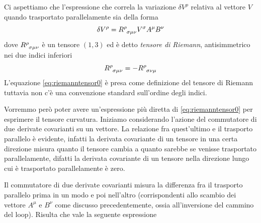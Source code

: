 \documentclass[twoside]{article}
\begin{document}
Ci aspettiamo che l'espressione che correla la variazione $\delta V^\rho$ relativa al vettore $V$ quando trasportato parallelamente sia della forma
\begin{equation}\label{eq:riemanntensor0}
	\delta V^\rho = R\indices{^\rho_\sigma_\mu_\nu}V^\sigma A^\mu B^\nu
\end{equation}
dove $R\indices{^\rho_\sigma_\mu_\nu}$ è un tensore $(1,3)$ ed è detto \emph{tensore di Riemann}, antisimmetrico nei due indici inferiori
\begin{equation}\label{eq:riemanntensor1}
		R\indices{^\rho_\sigma_\mu_\nu} = -R\indices{^\rho_\sigma_\nu_\mu}
\end{equation}
L'equazione \ref{eq:riemanntensor0} è presa come definizione del tensore di Riemann tuttavia non c'è una convenzione standard sull'ordine degli indici.

Vorremmo però poter avere un'espressione più diretta di \ref{eq:riemanntensor0} per esprimere il tensore curvatura. Iniziamo considerando l'azione del commutatore di due derivate covarianti su un vettore. La relazione fra quest'ultimo e il trasporto parallelo è evidente, infatti la derivata covariante di un tensore in una certa direzione misura quanto il tensore cambia a quanto sarebbe se venisse trasportato parallelamente, difatti la derivata covariante di un tensore nella direzione lungo cui è trasportato parallelamente è zero.

Il commutatore di due derivate covarianti misura la differenza fra il trasporto parallelo prima in un modo e poi nell'altro (corrispondenti allo scambio dei vettore $A^\mu$ e $B^\nu$ come discusso precedentemente, ossia all'inversione del cammino del loop). Risulta che vale la seguente espressione 
\end{document}
